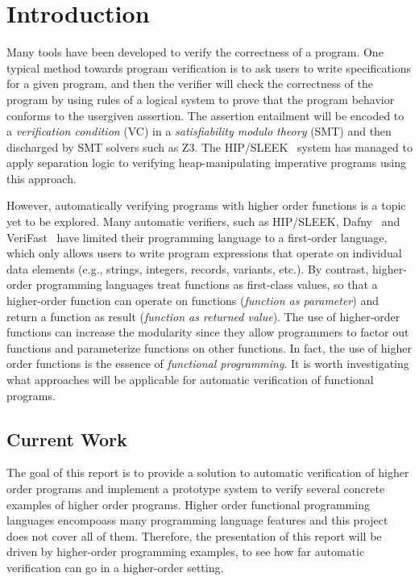 
\chapter{Introduction}
\vspace{2em}



Many tools have been developed to verify the correctness of a program. One typical method towards program verification is to ask users to write specifications for a given program, and then the verifier will check the correctness of the program by using rules of a logical system to prove that the program behavior conforms to the user\zz{}given assertion. The assertion entailment will be encoded to a \emph{verification condition} (VC) in a \emph{satisfiability modulo theory} (SMT) and then discharged by SMT solvers such as Z3. The HIP/SLEEK~\cite{Chin2012HipSleek} system has managed to apply separation logic to verifying heap-manipulating imperative programs using this approach.

However, automatically verifying programs with higher order functions is a topic yet to be explored. Many automatic verifiers, such as HIP/SLEEK, Dafny~\cite{Leino2010Dafny} and VeriFast~\cite{Jacobs2011Verifast}
have limited their programming language to a first-order language, which only allows users to write program expressions that operate on individual data elements (e.g., strings, integers, records, variants, etc.). By contrast, higher-order programming languages treat functions as first-class values, so that a higher-order function can operate on functions (\emph{function as parameter}) and return a function as result (\emph{function as returned value}). The use of higher-order functions can increase the modularity since they allow programmers to factor out functions and parameterize functions on other functions. In fact, the use of higher order functions is the essence of \emph{functional programming}. It is worth investigating what approaches will be applicable for automatic verification of functional programs.


\section{Current Work}

The goal of this report is to provide a solution to automatic verification of higher order programs and implement a prototype system to verify several concrete examples of higher order programs. Higher order functional programming languages encompoass many programming language features and this project does not cover all of them. Therefore, the presentation of this report will be driven by higher-order programming examples, to see how far automatic verification can go in a higher-order setting.

